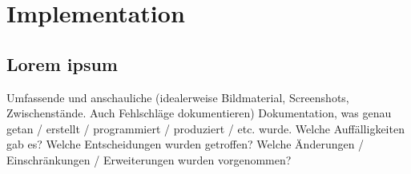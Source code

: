 \chapter{Implementation}

\section{Lorem ipsum}
\label{lorem-ipsum-implementation}

Umfassende und anschauliche (idealerweise Bildmaterial, Screenshots, Zwischenstände. Auch Fehlschläge dokumentieren) Dokumentation, was genau getan / erstellt / programmiert / produziert / etc. wurde. Welche Auffälligkeiten gab es? Welche Entscheidungen wurden getroffen? Welche Änderungen / Einschränkungen / Erweiterungen wurden vorgenommen?